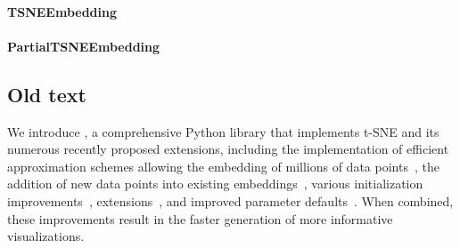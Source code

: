 \documentclass[article]{jss}
\newcommand{\opentsne}{\pkg{openTSNE}}
\begin{document}
\paragraph{TSNEEmbedding}

\paragraph{PartialTSNEEmbedding}


\subsection{Old text}

We introduce \opentsne, a comprehensive Python library that implements t-SNE and its numerous recently proposed extensions, including the implementation of efficient approximation schemes allowing the embedding of millions of data points~\citep{van2014accelerating,linderman2019fast}, the addition of new data points into existing embeddings~\citep{policar2021embedding}, various initialization improvements~\citep{kobak2019umap}, extensions~\citep{kobak2019heavy,kobak2019art}, and improved parameter defaults~\citep{belkina2019automated}. When combined, these improvements result in the faster generation of more informative visualizations.
\end{document}

